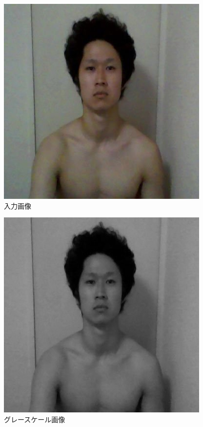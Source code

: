 \documentclass[10pt,a4paper]{jsarticle}
\begin{document}
\begin{figure}[h]
  \includegraphics[scale=1]{sutehage.png}
  \caption{入力画像}
  \label{fig:sutehage}
\end{figure}

\begin{figure}[h]
  \includegraphics[scale=1]{sutehagegray.png}
  \caption{グレースケール画像}
  \label{fig:sutehage}
  
\end{figure}
\end{document}
